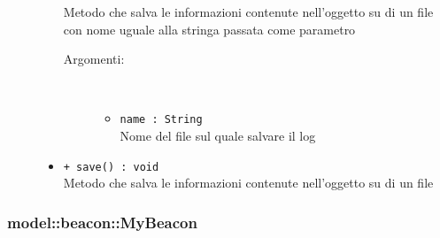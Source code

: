 \documentclass[../DefinizioneDiProdotto.tex]{subfiles}
\begin{document}
\begin{description}
\begin{itemize}
Metodo che salva le informazioni contenute nell'oggetto su di un file con nome uguale alla stringa passata come parametro
 \begin{description}
\item[Argomenti:] \
\begin{itemize}
\item \texttt{name : String}\\
Nome del file sul quale salvare il log\end{itemize}
\end{description}
\item \texttt{+ save() : void}\\
Metodo che salva le informazioni contenute nell'oggetto su di un file
 \end{itemize}
\end{description}

\subsubsection{model::beacon::MyBeacon}
\end{document}
